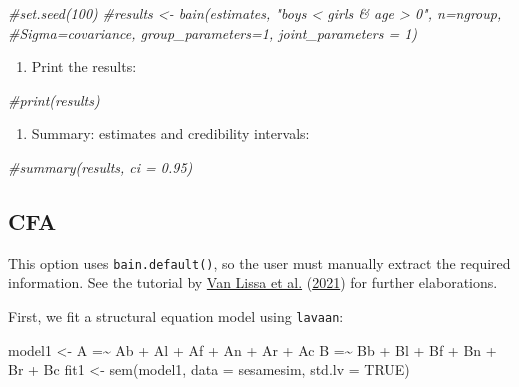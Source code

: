 \documentclass[
]{book}
\newenvironment{Shaded}{\begin{snugshade}}{\end{snugshade}}
\newcommand{\AttributeTok}[1]{\textcolor[rgb]{0.77,0.63,0.00}{#1}}
\newcommand{\CommentTok}[1]{\textcolor[rgb]{0.56,0.35,0.01}{\textit{#1}}}
\newcommand{\ConstantTok}[1]{\textcolor[rgb]{0.00,0.00,0.00}{#1}}
\newcommand{\FunctionTok}[1]{\textcolor[rgb]{0.00,0.00,0.00}{#1}}
\newcommand{\NormalTok}[1]{#1}
\newcommand{\OtherTok}[1]{\textcolor[rgb]{0.56,0.35,0.01}{#1}}
\newcommand{\StringTok}[1]{\textcolor[rgb]{0.31,0.60,0.02}{#1}}
\providecommand{\tightlist}{%
  \setlength{\itemsep}{0pt}\setlength{\parskip}{0pt}}
\begin{document}
\begin{Shaded}
\begin{Highlighting}[]
\CommentTok{\#set.seed(100)}
\CommentTok{\#results \textless{}{-} bain(estimates, "boys \textless{} girls \& age \textgreater{} 0", n=ngroup,}
\CommentTok{\#Sigma=covariance, group\_parameters=1, joint\_parameters = 1)}
\end{Highlighting}
\end{Shaded}

\begin{enumerate}
\def\labelenumi{\arabic{enumi})}
\setcounter{enumi}{4}
\tightlist
\item
  Print the results:
\end{enumerate}

\begin{Shaded}
\begin{Highlighting}[]
\CommentTok{\#print(results)}
\end{Highlighting}
\end{Shaded}

\begin{enumerate}
\def\labelenumi{\arabic{enumi})}
\setcounter{enumi}{5}
\tightlist
\item
  Summary: estimates and credibility intervals:
\end{enumerate}

\begin{Shaded}
\begin{Highlighting}[]
\CommentTok{\#summary(results, ci = 0.95)}
\end{Highlighting}
\end{Shaded}

\hypertarget{cfa}{%
\subsection{CFA}\label{cfa}}

This option uses \texttt{bain.default()}, so the user must manually extract the required information. See the tutorial by \protect\hyperlink{ref-van2021teacher}{Van Lissa et al.} (\protect\hyperlink{ref-van2021teacher}{2021}) for further elaborations.

First, we fit a structural equation model using \texttt{lavaan}:

\begin{Shaded}
\begin{Highlighting}[]
\NormalTok{model1 }\OtherTok{\textless{}{-}} \StringTok{\textquotesingle{}A =\textasciitilde{} Ab + Al + Af + An + Ar + Ac }
\StringTok{           B =\textasciitilde{} Bb + Bl + Bf + Bn + Br + Bc\textquotesingle{}}
\NormalTok{fit1 }\OtherTok{\textless{}{-}} \FunctionTok{sem}\NormalTok{(model1, }\AttributeTok{data =}\NormalTok{ sesamesim, }\AttributeTok{std.lv =} \ConstantTok{TRUE}\NormalTok{)}
\end{Highlighting}
\end{Shaded}
\end{document}
